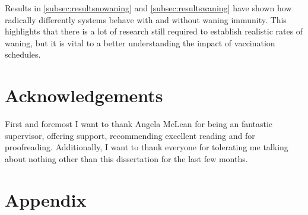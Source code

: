 \documentclass[a4paper,11pt] {scrartcl}
\begin{document}
Results in \autoref{subsec:resultsnowaning} and \autoref{subsec:resultswaning} have shown how radically differently systems behave with and without waning immunity. This highlights that there is a lot of research still required to establish realistic rates of waning, but it is vital to a better understanding the impact of vaccination schedules.

\section*{Acknowledgements}
First and foremost I want to thank Angela McLean for being an fantastic supervisor, offering support, recommending excellent reading and for proofreading. Additionally, I want to thank everyone for tolerating me talking about nothing other than this dissertation for the last few months.

\newpage
\singlespacing
{}
{}



\newpage
\singlespacing
\section*{Appendix} 
\label{sec:appendix}
\end{document}
